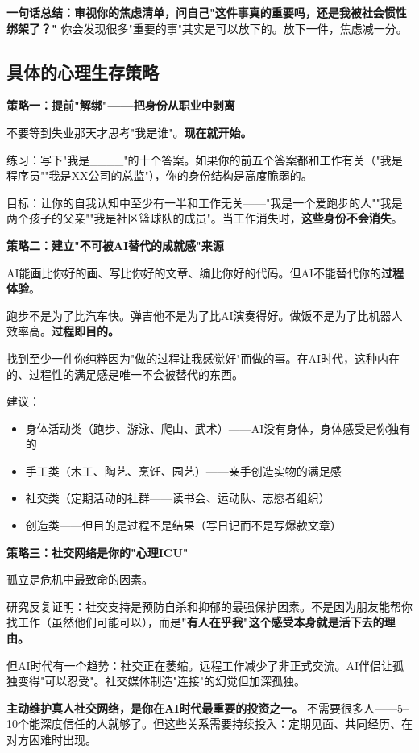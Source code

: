 \documentclass[a4paper,12pt,UTF8]{ctexart}
\begin{document}
\textbf{一句话总结：审视你的焦虑清单，问自己"这件事真的重要吗，还是我被社会惯性绑架了？"} 你会发现很多"重要的事"其实是可以放下的。放下一件，焦虑减一分。

\subsection{具体的心理生存策略}

\textbf{策略一：提前"解绑"——把身份从职业中剥离}

不要等到失业那天才思考"我是谁"。\textbf{现在就开始。}

练习：写下"我是\_\_\_\_"的十个答案。如果你的前五个答案都和工作有关（"我是程序员""我是XX公司的总监"），你的身份结构是高度脆弱的。

目标：让你的自我认知中至少有一半和工作无关——"我是一个爱跑步的人""我是两个孩子的父亲""我是社区篮球队的成员"。当工作消失时，\textbf{这些身份不会消失}。

\textbf{策略二：建立"不可被AI替代的成就感"来源}

AI能画比你好的画、写比你好的文章、编比你好的代码。但AI不能替代你的\textbf{过程体验}。

跑步不是为了比汽车快。弹吉他不是为了比AI演奏得好。做饭不是为了比机器人效率高。\textbf{过程即目的。}

找到至少一件你纯粹因为"做的过程让我感觉好"而做的事。在AI时代，这种内在的、过程性的满足感是唯一不会被替代的东西。

建议：
\begin{itemize}
\item 身体活动类（跑步、游泳、爬山、武术）——AI没有身体，身体感受是你独有的
\item 手工类（木工、陶艺、烹饪、园艺）——亲手创造实物的满足感
\item 社交类（定期活动的社群——读书会、运动队、志愿者组织）
\item 创造类——但目的是过程不是结果（写日记而不是写爆款文章）
\end{itemize}

\textbf{策略三：社交网络是你的"心理ICU"}

孤立是危机中最致命的因素。

研究反复证明：社交支持是预防自杀和抑郁的最强保护因素。不是因为朋友能帮你找工作（虽然他们可能可以），而是\textbf{"有人在乎我"这个感受本身就是活下去的理由。}

但AI时代有一个趋势：社交正在萎缩。远程工作减少了非正式交流。AI伴侣让孤独变得"可以忍受"。社交媒体制造"连接"的幻觉但加深孤独。

\textbf{主动维护真人社交网络，是你在AI时代最重要的投资之一。} 不需要很多人——5--10个能深度信任的人就够了。但这些关系需要持续投入：定期见面、共同经历、在对方困难时出现。
\end{document}
